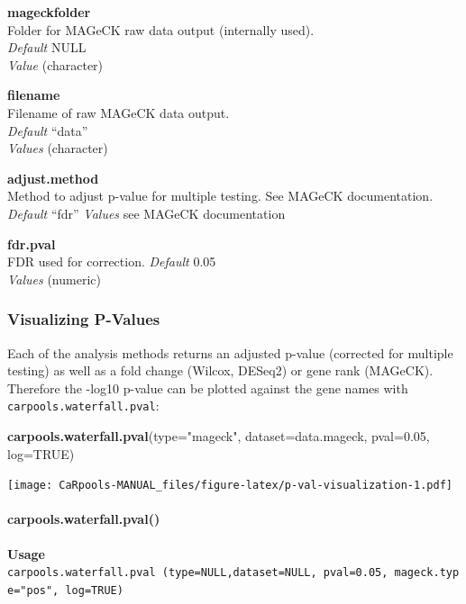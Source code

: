 \documentclass[]{article}
\newenvironment{Shaded}{\begin{snugshade}}{\end{snugshade}}
\newcommand{\KeywordTok}[1]{\textcolor[rgb]{0.13,0.29,0.53}{\textbf{{#1}}}}
\newcommand{\DataTypeTok}[1]{\textcolor[rgb]{0.13,0.29,0.53}{{#1}}}
\newcommand{\FloatTok}[1]{\textcolor[rgb]{0.00,0.00,0.81}{{#1}}}
\newcommand{\StringTok}[1]{\textcolor[rgb]{0.31,0.60,0.02}{{#1}}}
\newcommand{\OtherTok}[1]{\textcolor[rgb]{0.56,0.35,0.01}{{#1}}}
\newcommand{\NormalTok}[1]{{#1}}
\let\oldparagraph\paragraph
\renewcommand{\paragraph}[1]{\oldparagraph{#1}\mbox{}}
\begin{document}
\textbf{mageckfolder}\\
Folder for MAGeCK raw data output (internally used).\\
\emph{Default} NULL\\
\emph{Value} (character)

\textbf{filename}\\
Filename of raw MAGeCK data output.\\
\emph{Default} ``data''\\
\emph{Values} (character)

\textbf{adjust.method}\\
Method to adjust p-value for multiple testing. See MAGeCK
documentation.\\
\emph{Default} ``fdr'' \emph{Values} see MAGeCK documentation

\textbf{fdr.pval}\\
FDR used for correction. \emph{Default} 0.05\\
\emph{Values} (numeric)

\subsubsection{Visualizing P-Values}\label{visualizing-p-values}

Each of the analysis methods returns an adjusted p-value (corrected for
multiple testing) as well as a fold change (Wilcox, DESeq2) or gene rank
(MAGeCK).\\
Therefore the -log10 p-value can be plotted against the gene names with
\texttt{carpools.waterfall.pval}:

\begin{Shaded}
\begin{Highlighting}[]
\KeywordTok{carpools.waterfall.pval}\NormalTok{(}\DataTypeTok{type=}\StringTok{"mageck"}\NormalTok{, }\DataTypeTok{dataset=}\NormalTok{data.mageck, }\DataTypeTok{pval=}\FloatTok{0.05}\NormalTok{, }\DataTypeTok{log=}\OtherTok{TRUE}\NormalTok{)}
\end{Highlighting}
\end{Shaded}

\texttt{[image: CaRpools-MANUAL\_files/figure-latex/p-val-visualization-1.pdf]}

\paragraph{carpools.waterfall.pval()}\label{carpools.waterfall.pval}

\textbf{Usage}\\
\texttt{carpools.waterfall.pval\ (type=NULL,dataset=NULL,\ pval=0.05,\ mageck.type="pos",\ log=TRUE)}
\end{document}

